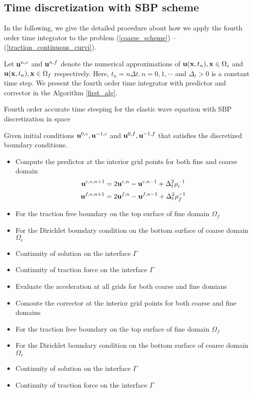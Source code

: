 \documentclass[a4paper]{article}
\begin{document}
\subsection{Time discretization with SBP scheme}
In the following, we give the detailed procedure about how we apply the fourth order time integrator to the problem (\ref{coarse_scheme}) -- (\ref{traction_continuous_curvi}). 

Let ${\bf u}^{n,c}$ and ${\bf u}^{n,f}$ denote the numerical approximations of ${\bf u}({\bf x},t_n), {\bf x}\in\Omega_c$ and ${\bf u}({\bf x},t_n), {\bf x}\in\Omega_f$ respectively. Here, $t_n = n\Delta t, n = 0,1,\cdots$ and $\Delta_t > 0$ is a constant time step. We present the fourth order time integrator with predictor and corrector in the Algorithm \ref{first_alg}.

\begin{algorithm}
	\caption{Fourth order accurate time steeping for the elastic wave equation with SBP discretization in space}\label{first_alg}
	Given initial conditions ${\bf u}^{0,c}, {\bf u}^{-1,c}$ and ${\bf u}^{0,f}, {\bf u}^{-1,f}$ that satisfies the discretized boundary conditions.
	
	\begin{itemize}
	\item  {Compute the predictor at the interior grid points for both fine and coarse domain
		\begin{equation*}
		   {\bf u}^{c,*,n+1} = 2{\bf u}^{c,n} - {\bf u}^{c,n-1} + \Delta_t^2\rho_c^{-1}
		\end{equation*}
		\begin{equation*}
		{\bf u}^{f,*,n+1} = 2{\bf u}^{f,n} - {\bf u}^{f,n-1} + \Delta_t^2\rho_f^{-1}
		\end{equation*}
	   }
   \item {For the traction free boundary on the top surface of fine domain $\Omega_f$
   }
   \item {For the Dirichlet boundary condition on the bottom surface of coarse domain $\Omega_c$
   }
  \item{Continuity of solution on the interface $\Gamma$
  }
  \item{Continuity of traction force on the interface $\Gamma$
  }
  \item{Evaluate the acceleration at all grids for both coarse and fine domians
  }
  \item{Comoute the corrector at the interior grid points for both coarse and fine domains
  }
 \item {For the traction free boundary on the top surface of fine domain $\Omega_f$
 }
 \item {For the Dirichlet boundary condition on the bottom surface of coarse domain $\Omega_c$
 }
 \item{Continuity of solution on the interface $\Gamma$
 }
 \item{Continuity of traction force on the interface $\Gamma$
 }
	\end{itemize}
\end{algorithm}
\end{document}
